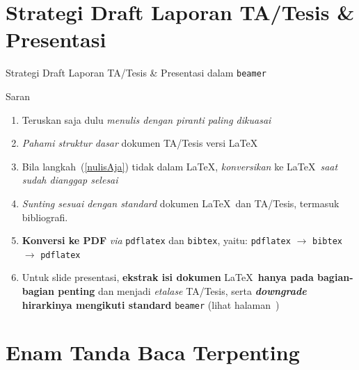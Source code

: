 \documentclass[11pt,            %
               aspectratio=169, %
               xcolor=svgnames,
               t                %
               ]{beamer}
\begin{document}
\section{Strategi Draft Laporan TA/Tesis \& Presentasi}

\begin{frame}{Strategi Draft Laporan TA/Tesis \& Presentasi dalam \texttt{beamer}}
\begin{block}{Saran}
\begin{enumerate}
\item Teruskan saja dulu \textit{menulis dengan piranti paling dikuasai}\label{nulisAja}
\item \textit{Pahami struktur dasar} dokumen TA/Tesis versi \LaTeX
\item Bila langkah~(\ref{nulisAja}) tidak dalam \LaTeX, \textit{konversikan} ke \LaTeX\ \textit{saat
      sudah dianggap selesai}
\item \textit{Sunting sesuai dengan standard} dokumen \LaTeX\ dan TA/Tesis, termasuk bibliografi.
\item \textbf{Konversi ke PDF} \textit{via} \texttt{pdflatex} dan \texttt{bibtex}, yaitu:
      \texttt{pdflatex} $ \rightarrow $ \texttt{bibtex} $ \rightarrow $ \texttt{pdflatex}
\item Untuk slide presentasi, \textbf{ekstrak isi dokumen} \LaTeX\ \textbf{hanya pada bagian-bagian penting} dan menjadi \textit{etalase} TA/Tesis, serta \textit{\bfseries downgrade} \textbf{hirarkinya mengikuti standard }\texttt{beamer} (lihat halaman~\pageref{hirarki})
\end{enumerate}
\end{block}
\end{frame}

\begin{frame}[plain]
    \vfill
    \vfill
\end{frame}

\section{Enam Tanda Baca Terpenting}
\end{document}
